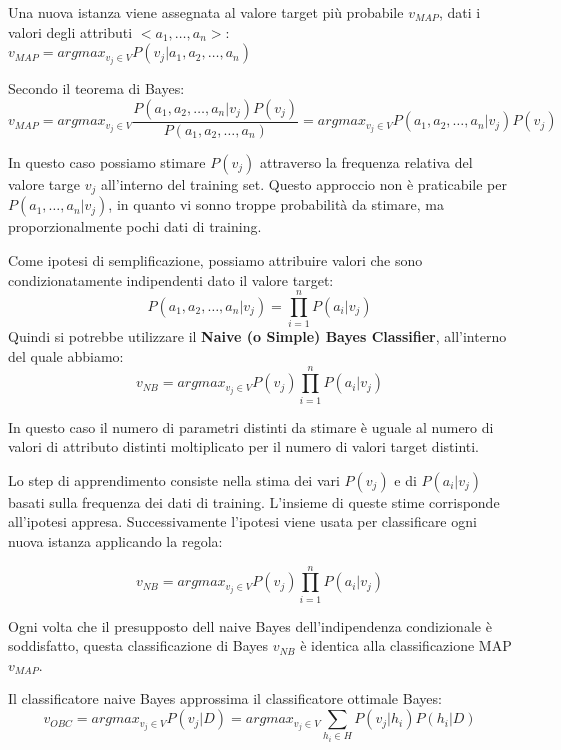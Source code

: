 \documentclass[a4paper]{extarticle}
\begin{document}
Una nuova istanza viene assegnata al valore target più probabile $v_{MAP}$, dati i valori degli attributi $<a_1, \dots, a_n>$:\\ $v_{MAP} = argmax_{v_j \in V} P(v_j | a_1,a_2,\dots,a_n)$

Secondo il teorema di  Bayes:
\begin{equation*}
v_{MAP} = argmax_{v_j\in V} \dfrac{P(a_1,a_2,\dots,a_n | v_j)P(v_j)}{P(a_1,a_2,\dots,a_n)} = argmax_{v_j \in V} P(a_1, a_2,\dots,a_n | v_j)P(v_j)
\end{equation*}

In questo caso possiamo stimare $P(v_j)$ attraverso la frequenza relativa del valore targe $v_j$ all'interno del training set. Questo approccio non è praticabile per $P(a_1,\dots,a_n|v_j)$, in quanto vi sonno troppe probabilità da stimare, ma proporzionalmente pochi dati di training.

Come ipotesi di semplificazione, possiamo attribuire valori che sono condizionatamente indipendenti dato il valore target:
\begin{equation*}
P(a_1,a_2,\dots,a_n|v_j) = \prod_{i=1}^n P(a_i|v_j)
\end{equation*}
Quindi si potrebbe utilizzare il \textbf{Naive (o Simple) Bayes Classifier}, all'interno del quale abbiamo:
\begin{equation*}
v_{NB} = argmax_{v_j \in V} P(v_j)\prod_{i=1}^n P(a_i|v_j)
\end{equation*}

In questo caso il numero di parametri distinti da stimare è uguale al numero di valori di attributo distinti moltiplicato per il numero di valori target distinti.

Lo step di apprendimento consiste nella stima dei vari $P(v_j)$ e di $P(a_i|v_j)$ basati sulla frequenza dei dati di training. L'insieme di queste stime corrisponde all'ipotesi appresa. Successivamente l'ipotesi viene usata per classificare ogni nuova istanza applicando la regola:

\begin{equation*}
v_{NB} = argmax_{v_j \in V} P(v_j) \prod_{i=1}^n P(a_i|v_j)
\end{equation*}

Ogni volta che il presupposto dell naive Bayes dell'indipendenza condizionale è soddisfatto, questa classificazione di Bayes $v_{NB}$ è identica alla classificazione MAP $v_{MAP}$.

Il classificatore naive Bayes approssima il classificatore ottimale Bayes:
\begin{equation*}
v_{OBC} = argmax_{v_j \in V} P(v_j | D) = argmax_{v_j \in V} \sum\limits_{h_i \in H} P(v_j | h_i) P(h_i|D)
\end{equation*}
\end{document}
